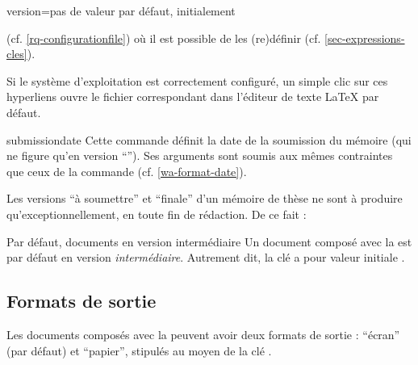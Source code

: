 {\begin{docKey}{version}{=\textbar{}\textbar{}\textbar{}\textbar{}\textbar{}}{pas
      de valeur par défaut, initialement }
\begin{description}
\begin{itemize}
\begin{enumerate}
\begin{enumerate}
\begin{itemize}
              (cf.  \vref{rq-configurationfile}) où il est possible de les
              (re)définir (cf. \vref{sec-expressions-cles}).
            \end{itemize}
          \end{enumerate}
          Si le système d'exploitation est correctement configuré, un simple
          clic sur ces hyperliens ouvre le fichier correspondant dans l'éditeur
          de texte \LaTeX{} par défaut.
        \end{enumerate}
      \end{itemize}
    \end{description}
  \end{docKey}
}

\begin{docCommand}{submissiondate}{}
  Cette commande définit la date de la soumission du mémoire (qui ne figure
  qu'en version \enquote{}). Ses arguments sont soumis aux
  mêmes contraintes que ceux de la commande 
  (cf. \vref{wa-format-date}).
\end{docCommand}

Les versions \enquote{à soumettre} et \enquote{finale} d'un mémoire de thèse ne
sont à produire qu'exceptionnellement, en toute fin de rédaction. De ce fait :
\begin{dbwarning}{Par défaut, documents en version intermédiaire}{}
  Un document composé avec la \yatcl{} est par défaut en version
  \emph{intermédiaire}. Autrement dit, la clé  a pour valeur
  initiale .
\end{dbwarning}

\subsection{Formats de sortie}
\label{sec-formats-de-sortie}

Les documents composés avec la \yatcl{} peuvent avoir deux formats de sortie :
\enquote{écran} (par défaut) et \enquote{papier}, stipulés au moyen de la clé
.


